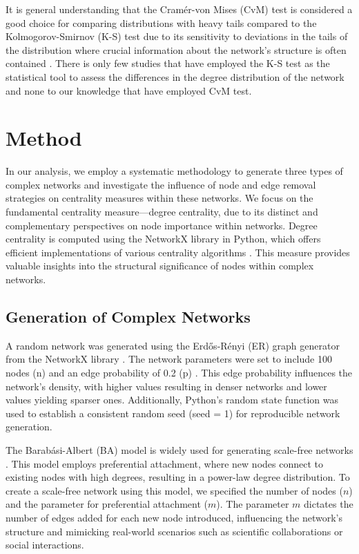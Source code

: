 \documentclass[conference]{IEEEtran} %
\begin{document}
It is general understanding that the Cramér-von Mises (CvM) test is considered a good choice for comparing distributions with heavy tails compared to the Kolmogorov-Smirnov (K-S) test due to its sensitivity to deviations in the tails of the distribution where crucial information about the network's structure is often contained \cite{stephens1974edf}. There is only few studies that have employed the K-S test as the statistical tool to assess the differences in the degree distribution of the network and none to our knowledge that have employed CvM test.

\section{Method}
In our analysis, we employ a systematic methodology to generate three types of complex networks and investigate the influence of node and edge removal strategies on centrality measures within these networks. We focus on the fundamental centrality measure—degree centrality, due to its distinct and complementary perspectives on node importance within networks. Degree centrality is computed using the NetworkX library in Python, which offers efficient implementations of various centrality algorithms \cite{hagberg2008exploring}. This measure provides valuable insights into the structural significance of nodes within complex networks.

\subsection{Generation of Complex Networks}

A random network was generated using the Erdős-Rényi (ER) graph generator from the NetworkX library \cite{hagberg2008exploring}. The network parameters were set to include 100 nodes (n) and an edge probability of 0.2 (p) \cite{erdos1959random, gilbert1959random}. This edge probability influences the network's density, with higher values resulting in denser networks and lower values yielding sparser ones. Additionally, Python's random state function was used to establish a consistent random seed (seed = 1) for reproducible network generation.

The Barabási-Albert (BA) model is widely used for generating scale-free networks \cite{barabasi1999emergence}. This model employs preferential attachment, where new nodes connect to existing nodes with high degrees, resulting in a power-law degree distribution. To create a scale-free network using this model, we specified the number of nodes ($n$) and the parameter for preferential attachment ($m$). The parameter $m$ dictates the number of edges added for each new node introduced, influencing the network's structure and mimicking real-world scenarios such as scientific collaborations or social interactions.
\end{document}
